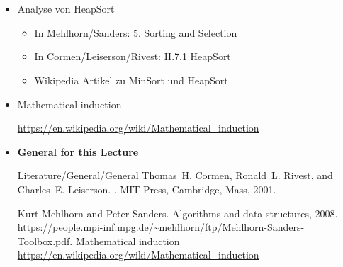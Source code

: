 \documentclass{beamer}
\def\LectureLanguage{eng}
\newcommand\eatdot[1]{}
\begin{document}
\section*{\appendixname}
\subsection*{\LectureFurtherLiterature}
%
\begin{frame}{\LectureFurtherLiterature}
  \small
  \begin{itemize}
    \item Analyse von HeapSort
      \begin{itemize}
      \item In Mehlhorn/Sanders: 5. Sorting and Selection
      \item In Cormen/Leiserson/Rivest: II.7.1 HeapSort
      \item Wikipedia Artikel zu MinSort und HeapSort
      \end{itemize}
    \item      Mathematical induction
      \begin{center}
        \url{https://en.wikipedia.org/wiki/Mathematical_induction}\eatdot.
      \end{center}
  \end{itemize}
\end{frame}

\begin{frame}{\LectureFurtherLiterature}
  \small
  \begin{itemize}
  \item       \textbf{General for this Lecture}
      \begin{btSect}{Literature/General/General}
         Thomas~H. Cormen, Ronald~L. Rivest, and Charles~E. Leiserson.
         .
         \newblock MIT Press, Cambridge, Mass, 2001.
         
         Kurt Mehlhorn and Peter Sanders.
         \newblock Algorithms and data structures, 2008.
         \newblock
         \url{https://people.mpi-inf.mpg.de/~mehlhorn/ftp/Mehlhorn-Sanders-Toolbox.pdf}.
         Mathematical induction\eatdot.
         \newblock \url{https://en.wikipedia.org/wiki/Mathematical_induction}\eatdot.

      \end{btSect}
  \end{itemize}
\end{frame}

\end{document}

